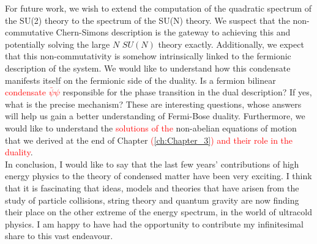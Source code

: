     \indent For future work, we wish to extend the computation of the quadratic spectrum of the SU(2) theory to the spectrum of the SU(N) theory. We suspect that the non-commutative Chern-Simons description is the gateway to achieving this and potentially solving the large $N$ $SU(N)$ theory exactly. Additionally, we expect that this non-commutativity is somehow intrinsically linked to the fermionic description of the system. We would like to understand how this condensate manifests itself on the fermionic side of the duality. Is a fermion bilinear \textcolor{red}{condensate $\bar{\psi} \psi$} responsible for the phase transition in the dual description? If yes, what is the precise mechanism? These are interesting questions, whose answers will help us gain a better understanding of Fermi-Bose duality. Furthermore, we would like to understand the \textcolor{red}{solutions of the} non-abelian equations of motion that we derived at the end of Chapter \textcolor{red}{(}\ref{ch:Chapter_3}\textcolor{red}{)} \textcolor{red}{and their role in the duality}.\\
    \indent In conclusion, I would like to say that the last few years' contributions of high energy physics to the theory of condensed matter have been very exciting. I think that it is fascinating that ideas, models and theories that have arisen from the study of particle collisions, string theory and quantum gravity are now finding their place on the other extreme of the energy spectrum, in the world of ultracold physics. I am happy to have had the opportunity to contribute my infinitesimal share to this vast endeavour.

